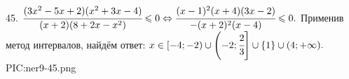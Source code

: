 45. $\cfrac{(3x^2-5x+2)(x^2+3x-4)}{(x+2)(8+2x-x^2)}\leqslant0\Leftrightarrow\cfrac{(x-1)^2(x+4)(3x-2)}{-(x+2)^2(x-4)}\leqslant0.$ Применив метод интервалов, найдём ответ: $x\in[-4;-2)\cup\left(-2;\cfrac{2}{3}\right]\cup\{1\}\cup(4;+\infty).$
{{PIC:ner9-45.png}}\\

